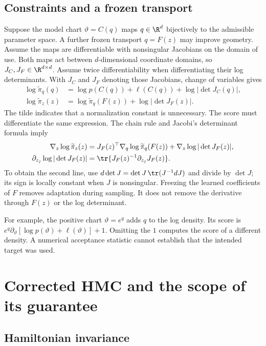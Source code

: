 \subsection{Constraints and a frozen transport}

Suppose the model chart $\vartheta=C(q)$ maps $q\in\R^d$ bijectively to
the admissible parameter space. A further frozen transport $q=F(z)$ may
improve geometry. Assume the maps are differentiable with nonsingular
Jacobians on the domain of use. Both maps act between $d$-dimensional
coordinate domains, so $J_C,J_F\in\R^{d\times d}$. Assume twice
differentiability when differentiating their log determinants. With $J_C$
and $J_F$ denoting those Jacobians, change of variables gives
\begin{align}
 \log\widetilde\pi_q(q)
 &=\log p(C(q))+\ell(C(q))+\log|\det J_C(q)|,\\
 \log\widetilde\pi_z(z)
 &=\log\widetilde\pi_q(F(z))+\log|\det J_F(z)|.
 \label{eq:bf-modern-transformed-target}
\end{align}
The tilde indicates that a normalization constant is unnecessary. The score
must differentiate the same expression. The chain rule and Jacobi's
determinant formula imply
\begin{align}
 \nabla_z\log\widetilde\pi_z(z)
 &=J_F(z)^\top\nabla_q\log\widetilde\pi_q(F(z))
      +\nabla_z\log|\det J_F(z)|,\\
 \partial_{z_j}\log|\det J_F(z)|
 &=\tr\{J_F(z)^{-1}\partial_{z_j}J_F(z)\}.
 \label{eq:bf-modern-transformed-score}
\end{align}
To obtain the second line, use
$d\det J=\det J\,\tr(J^{-1}dJ)$ and divide by $\det J$; its sign is
locally constant when $J$ is nonsingular. Freezing the learned coefficients
of $F$ removes adaptation during sampling. It does not remove the derivative
through $F(z)$ or the log determinant.

For example, the positive chart $\vartheta=e^q$ adds $q$ to the log density.
Its score is
$e^q\partial_\vartheta[\log p(\vartheta)+\ell(\vartheta)]+1$.
Omitting the $1$ computes the score of a different density. A numerical
acceptance statistic cannot establish that the intended target was used.

\section{Corrected HMC and the scope of its guarantee}
\label{sec:bf-modern-hmc-foundation}

\subsection{Hamiltonian invariance}


